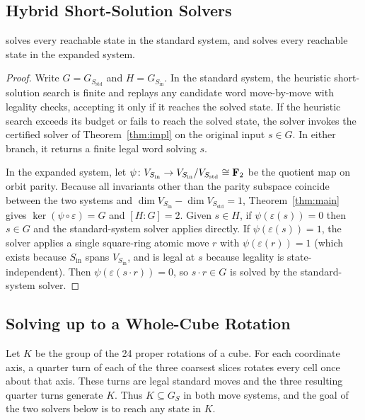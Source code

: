 \documentclass[a4paper,11pt]{article}
\begin{document}
\subsection{Hybrid Short-Solution Solvers}\label{sec:short-hybrid}

\begin{corollary}
 solves every reachable state in the standard system, and  solves every reachable state in the expanded system.
\end{corollary}

\begin{proof}
Write $G=G_{S_{\mathrm{std}}}$ and $H=G_{S_{\mathrm{in}}}$.
In the standard system, the heuristic short-solution search is finite and replays any candidate word move-by-move with legality checks, accepting it only if it reaches the solved state.
If the heuristic search exceeds its budget or fails to reach the solved state, the solver invokes the certified solver of Theorem~\ref{thm:impl} on the original input $s\in G$. In either branch, it returns a finite legal word solving $s$.

In the expanded system, let $\psi\colon V_{S_{\mathrm{in}}}\to V_{S_{\mathrm{in}}}/V_{S_{\mathrm{std}}}\cong\mathbf{F}_2$ be the quotient map on orbit parity.
Because all invariants other than the parity subspace coincide between the two systems and $\dim V_{S_{\mathrm{in}}}-\dim V_{S_{\mathrm{std}}}=1$, Theorem~\ref{thm:main} gives $\ker(\psi\circ\varepsilon)=G$ and $[H:G]=2$.
Given $s\in H$, if $\psi(\varepsilon(s))=0$ then $s\in G$ and the standard-system solver applies directly.
If $\psi(\varepsilon(s))=1$, the solver applies a single square-ring atomic move $r$ with $\psi(\varepsilon(r))=1$ (which exists because $S_{\mathrm{in}}$ spans $V_{S_{\mathrm{in}}}$, and is legal at $s$ because legality is state-independent).
Then $\psi(\varepsilon(s\cdot r))=0$, so $s\cdot r\in G$ is solved by the standard-system solver.
\end{proof}

\subsection{Solving up to a Whole-Cube Rotation}\label{sec:whole-rotation}

Let $K$ be the group of the 24 proper rotations of a cube.
For each coordinate axis, a quarter turn of each of the three coarsest slices rotates every cell once about that axis.
These turns are legal standard moves and the three resulting quarter turns generate $K$.
Thus $K\subseteq G_S$ in both move systems, and the goal of the two solvers below is to reach any state in $K$.
\end{document}
